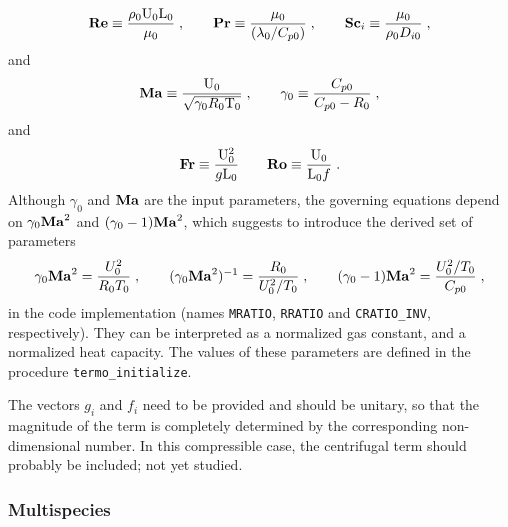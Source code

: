 \begin{equation}
    \mathrm{\bf Re} \equiv \frac{\rho_0 \mathrm{U}_0 \mathrm{L}_0}{\mu_0}\;, \qquad
    \mathrm{\bf Pr} \equiv \frac{\mu_0}{(\lambda_0/C_{p0})}\;, \qquad
    \mathrm{\bf Sc}_i \equiv \frac{\mu_0}{\rho_0 D_{i0}}\;,
\end{equation}
and
\begin{equation}
    \mathrm{\bf Ma}  \equiv \frac{\mathrm{U}_0}{\sqrt{\gamma_0 R_0 \mathrm{T}_0}}\;, \qquad
    \gamma_0 \equiv \frac{C_{p0}}{C_{p0}-R_0}\;,
\end{equation}
and
\begin{equation}
    \mathrm{\bf Fr} \equiv \frac{\mathrm{U}_0^2}{g\mathrm{L}_0} \qquad \mathrm{\bf Ro} \equiv \frac{\mathrm{U}_0}{\mathrm{L}_0f} \;.
\end{equation}
Although $\gamma_0$ and $\mathrm{\bf Ma}$ are the input parameters, the governing equations depend on $\gamma_0\mathrm{\bf Ma}^2$ and $(\gamma_0-1)\mathrm{\bf Ma}^2$, which suggests to introduce the derived set of parameters
\begin{equation}
    \gamma_0\mathrm{\bf Ma}^2=\frac{U_0^2}{R_0T_0}\;,\qquad (\gamma_0\mathrm{\bf Ma}^2)^{-1}=\frac{R_0}{U^2_0/T_0}\;,\qquad (\gamma_0-1)\mathrm{\bf Ma}^2 =\frac{U_0^2/T_0}{C_{p0}} \;,
\end{equation}
in the code implementation (names \texttt{MRATIO}, \texttt{RRATIO} and \texttt{CRATIO\_INV}, respectively). They can be interpreted as a normalized gas constant, and a normalized heat capacity. The values of these parameters are defined in the procedure \texttt{termo\_initialize}.

The vectors $g_i$ and $f_i$ need to be provided and should be unitary, so that the magnitude of the term is completely determined by the corresponding non-dimensional number. In this compressible case, the centrifugal term should probably be included; not yet studied.

\subsubsection{Multispecies}

